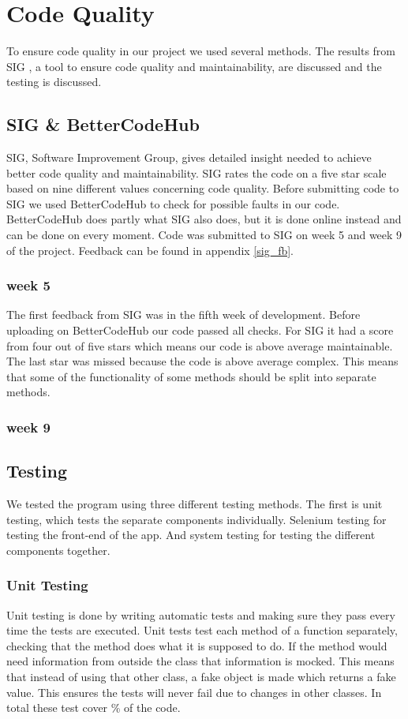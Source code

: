 \newpage

\chapter{Code Quality}
To ensure code quality in our project we used several methods. The results from SIG \cite{sig}, a tool to ensure code quality and maintainability, are discussed and the testing is discussed.

\section{SIG \& BetterCodeHub}
SIG, Software Improvement Group, gives detailed insight needed to achieve better code quality and maintainability. SIG rates the code on a five star scale based on nine different values concerning code quality. Before submitting code to SIG we used BetterCodeHub\cite{better_code_hub} to check for possible faults in our code. BetterCodeHub does partly what SIG also does, but it is done online instead and can be done on every moment. Code was submitted to SIG on week 5 and week 9 of the project. Feedback can be found in appendix \ref{sig_fb}.

\subsection{week 5}
The first feedback from SIG was in the fifth week of development. Before uploading on BetterCodeHub our code passed all checks. For SIG it had a score from four out of five stars which means our code is above average maintainable. The last star was missed because the code is above average complex. This means that some of the functionality of some methods should be split into separate methods.

\subsection{week 9}


\section{Testing}
We tested the program using three different testing methods. The first is unit testing, which tests the separate components individually. Selenium testing for testing the front-end of the app. And system testing for testing the different components together.


\subsection{Unit Testing}
Unit testing is done by writing automatic tests and making sure they pass every time the tests are executed. Unit tests test each method of a function separately, checking that the method does what it is supposed to do. If the method would need information from outside the class that information is mocked. This means that instead of using that other class, a fake object is made which returns a fake value. This ensures the tests will never fail due to changes in other classes. In total these test cover \todo \% of the code.


